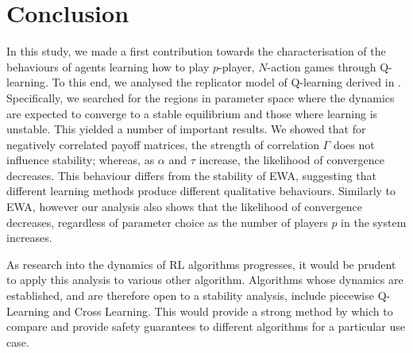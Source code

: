 \documentclass{article}
\begin{document}
\section{Conclusion}

In this study, we made a first contribution towards the
characterisation of the behaviours of agents learning how to play
$p$-player, $N$-action games through Q-learning. To this end, we
analysed the replicator model of Q-learning derived in \cite{tuyls:iteratedgames}. Specifically, we searched for the regions in parameter space
where the dynamics are expected to converge to a stable equilibrium
and those where learning is unstable. This yielded a number of
important results. We showed that for negatively correlated payoff matrices, the
strength of correlation $\Gamma$ does not influence stability; whereas, as
$\alpha$ and $\tau$ increase, the likelihood of convergence decreases. This behaviour differs from the stability of EWA, suggesting that different learning methods produce different qualitative behaviours. Similarly to EWA, however our
analysis also shows that the likelihood of convergence decreases,
regardless of parameter choice as the number of players $p$ in the
system increases.

As research into the dynamics of RL algorithms
progresses, it would be prudent to apply this analysis to various
other algorithm. Algorithms whose dynamics are established, and are
therefore open to a stability analysis, include piecewise Q-Learning
and Cross Learning. This would provide a strong method by which to
compare and provide safety guarantees to different algorithms for a
particular use case.




\end{document}
